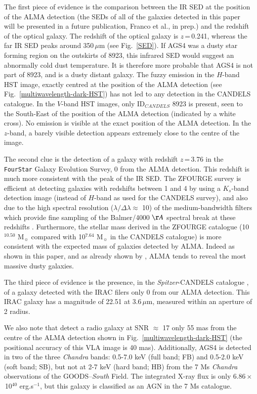 \documentclass[longauth]{aa}
\begin{document}
\begin{itemize}
The first piece of evidence is the comparison between the IR SED at the position of the ALMA detection (the SEDs of all of the galaxies detected in this paper will be presented in a future publication, Franco et al., in prep.) and the redshift of the optical galaxy. The redshift of the optical galaxy is $z$\,=\,0.241, whereas the far IR SED peaks around 350\,$\mu$m (see Fig.~\ref{SED}). If AGS4 was a dusty star forming region on the outskirts of 8923, this infrared SED would suggest an abnormally cold dust temperature. It is therefore more probable that AGS4 is not part of 8923, and is a dusty distant galaxy. The fuzzy emission in the $H$-band HST image, exactly centred at the position of the ALMA detection (see Fig.~\ref{multiwavelength-dark-HST}) has not led to any detection in the CANDELS catalogue. In the $V$-band HST images, only ID$_{CANDELS}$ 8923 is present, seen to the South-East of the position of the ALMA detection (indicated by a white cross). No emission is visible at the exact position of the ALMA detection. In the $z$-band, a barely visible detection appears extremely close to the centre of the image.

The second clue is the detection of a galaxy with redshift $z$\,=\,3.76 in the \texttt{FourStar} Galaxy Evolution Survey, 0 from the ALMA detection. This redshift is much more consistent with the peak of the IR SED. The ZFOURGE survey is efficient at detecting galaxies with redshifts between 1 and 4 by using a $K_s$-band detection image (instead of $H$-band as used for the CANDELS survey), and also due to the high spectral resolution ($\lambda/\Delta\lambda \approx$ 10) of the medium-bandwidth filters which provide fine sampling of the Balmer/4000 $\AA$ spectral break at these redshifts \mbox{\citep{Tomczak2016}}. Furthermore, the stellar mass derived in the ZFOURGE catalogue (10$^{10.50}$ M$_\sun$ compared with 10$^{7.64}$ M$_\sun$ in the CANDELS catalogue) is more consistent with the expected mass of galaxies detected by ALMA. Indeed as shown in this paper, and as already shown by \cite{Dunlop2017}, ALMA tends to reveal the most massive dusty galaxies. 

The third piece of evidence is the presence, in the \textit{Spitzer}-CANDELS catalogue \citep{Ashby2015}, of a galaxy detected with the IRAC filers only 0 from our ALMA detection. This IRAC galaxy has a magnitude of 22.51 at 3.6\,$\mu$m, measured within an aperture of 2 radius.

We also note that \cite{Rujopakarn2016} detect a radio galaxy at SNR $\approx$ 17 only 55 mas from the centre of the ALMA detection shown in Fig.~\ref{multiwavelength-dark-HST} (the positional accuracy of this VLA image is 40 mas).
Additionally, AGS4 is detected in two of the three \textit{Chandra} bands: 0.5-7.0 keV (full band; FB) and 0.5-2.0 keV (soft band; SB), but not at 2-7 keV (hard band; HB) from the 7 Ms \textit{Chandra} observations of the GOODS--\textit{South} Field. The integrated X-ray flux is only 6.86\,$\times$\,10$^{40}$ erg.s$^{-1}$, but this galaxy is classified as an AGN in the 7 Ms catalogue.


\end{itemize}
\end{document}
